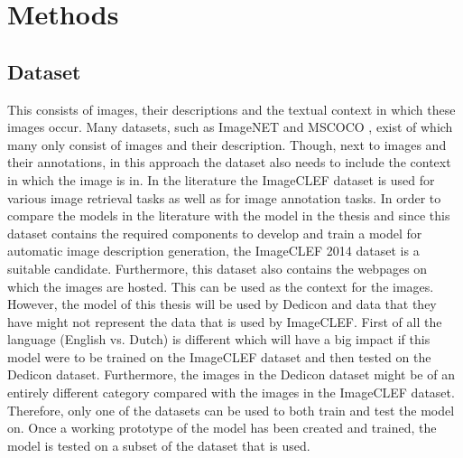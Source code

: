 \section{Methods}

\subsection{Dataset}
This consists of images, their descriptions and the textual context in which these images occur. Many datasets, such as ImageNET \cite{Russakovsky2012} and MSCOCO \cite{Lin2014}, exist of which many only consist of images and their description. Though, next to images and their annotations, in this approach the dataset also needs to include the context in which the image is in. In the literature the ImageCLEF dataset is used for various image retrieval tasks as well as for image annotation tasks. In order to compare the models in the literature with the model in the thesis and since this dataset contains the required components to develop and train a model for automatic image description generation, the ImageCLEF 2014 dataset is a suitable candidate. Furthermore, this dataset also contains the webpages on which the images are hosted. This can be used as the context for the images. However, the model of this thesis will be used by Dedicon and data that they have might not represent the data that is used by ImageCLEF. First of all the language (English vs. Dutch) is different which will have a big impact if this model were to be trained on the ImageCLEF dataset and then tested on the Dedicon dataset. Furthermore, the images in the Dedicon dataset might be of an entirely different category compared with the images in the ImageCLEF dataset. Therefore, only one of the datasets can be used to both train and test the model on. Once a working prototype of the model has been created and trained, the model is tested on a subset of the dataset that is used. 